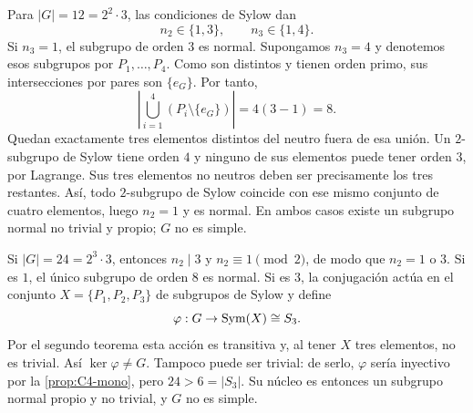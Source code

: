 \begin{ejem}[Orden $12$]
Para $|G|=12=2^2\cdot3$, las condiciones de Sylow dan
\[
n_2\in\{1,3\},\qquad n_3\in\{1,4\}.
\]
Si $n_3=1$, el subgrupo de orden $3$ es normal. Supongamos $n_3=4$ y denotemos esos subgrupos por $P_1,\ldots,P_4$. Como son distintos y tienen orden primo, sus intersecciones por pares son $\{e_G\}$. Por tanto,
\[
\left|\bigcup_{i=1}^4(P_i\setminus\{e_G\})\right|=4(3-1)=8.
\]
Quedan exactamente tres elementos distintos del neutro fuera de esa unión. Un $2$-subgrupo de Sylow tiene orden $4$ y ninguno de sus elementos puede tener orden $3$, por Lagrange. Sus tres elementos no neutros deben ser precisamente los tres restantes. Así, todo $2$-subgrupo de Sylow coincide con ese mismo conjunto de cuatro elementos, luego $n_2=1$ y es normal. En ambos casos existe un subgrupo normal no trivial y propio; $G$ no es simple.
\end{ejem}

\begin{ejem}[Orden $24$]
Si $|G|=24=2^3\cdot3$, entonces $n_2\mid3$ y $n_2\equiv1\pmod2$, de modo que $n_2=1$ o $3$. Si es $1$, el único subgrupo de orden $8$ es normal. Si es $3$, la conjugación actúa en el conjunto $X=\{P_1,P_2,P_3\}$ de subgrupos de Sylow y define
\[
\varphi:G\to\operatorname{Sym}(X)\cong S_3.
\]
Por el segundo teorema esta acción es transitiva y, al tener $X$ tres elementos, no es trivial. Así $\ker\varphi\ne G$. Tampoco puede ser trivial: de serlo, $\varphi$ sería inyectivo por la \cref{prop:C4-mono}, pero $24>6=|S_3|$. Su núcleo es entonces un subgrupo normal propio y no trivial, y $G$ no es simple.
\end{ejem}

